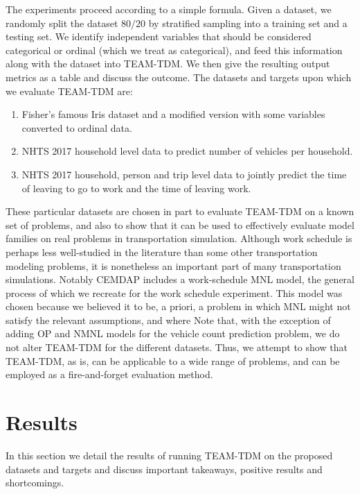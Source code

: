 \documentclass[conference]{IEEEtran}
\begin{document}
The experiments proceed according to a simple formula.
 Given a dataset, we randomly split the dataset $80/20$ by stratified sampling into a training set and a testing set.
 We identify independent variables that should be considered categorical or ordinal (which we treat as categorical), and feed this information along with the dataset into TEAM-TDM.
 We then give the resulting output metrics as a table and discuss the outcome.
 The datasets and targets upon which we evaluate TEAM-TDM are:
 \begin{enumerate} 
  \item Fisher's famous Iris dataset and a modified version with some variables converted to ordinal data.
  \item NHTS 2017 household level data to predict number of vehicles per household.
  \item NHTS 2017 household, person and trip level data to jointly predict the time of leaving to go to work and the time of leaving work.
 \end{enumerate}

These particular datasets are chosen in part to evaluate TEAM-TDM on a known set of problems, and also to show that it can be used to effectively evaluate model families on real problems in transportation simulation.
 Although work schedule is perhaps less well-studied in the literature than some other transportation modeling problems, it is nonetheless an important part of many transportation simulations.
 Notably CEMDAP \cite{pinjari2008cemdap} includes a work-schedule MNL model, the general process of which we recreate for the work schedule experiment.
 This model was chosen because we believed it to be, a priori, a problem in which MNL might not satisfy the relevant assumptions, and where 
 Note that, with the exception of adding OP and NMNL models for the vehicle count prediction problem, we do not alter TEAM-TDM for the different datasets.
 Thus, we attempt to show that TEAM-TDM, as is, can be applicable to a wide range of problems, and can be employed as a fire-and-forget evaluation method.

\section{Results} \label{section:results}

In this section we detail the results of running TEAM-TDM on the proposed datasets and targets and discuss important takeaways, positive results and shortcomings.
\end{document}
